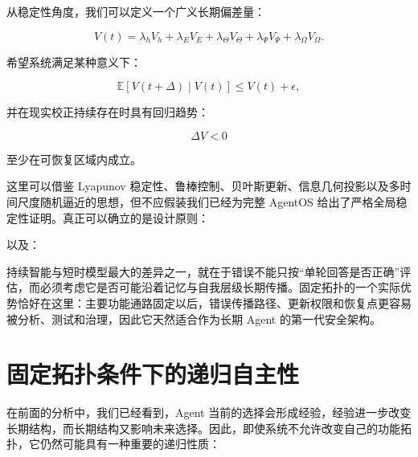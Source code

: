 从稳定性角度，我们可以定义一个广义长期偏差量：

\[
V(t)
=
\lambda_h V_h
+
\lambda_E V_E
+
\lambda_\Theta V_\Theta
+
\lambda_\Psi V_\Psi
+
\lambda_\Omega V_\Omega.
\]

希望系统满足某种意义下：

\[
\mathbb{E}
[
V(t+\Delta)
\mid
V(t)
]
\leq
V(t)+\epsilon,
\]

并在现实校正持续存在时具有回归趋势：

\[
\Delta V<0
\]

至少在可恢复区域内成立。

这里可以借鉴 Lyapunov 稳定性、鲁棒控制、贝叶斯更新、信息几何投影以及多时间尺度随机逼近的思想，但不应假装我们已经为完整 AgentOS 给出了严格全局稳定性证明。真正可以确立的是设计原则：

\begin{statementbox}
\centering
{}
\end{statementbox}

\begin{statementbox}
\centering
{}
\end{statementbox}

\begin{statementbox}
\centering
{}
\end{statementbox}

以及：

\begin{statementbox}
\centering
{}
\end{statementbox}

持续智能与短时模型最大的差异之一，就在于错误不能只按“单轮回答是否正确”评估，而必须考虑它是否可能沿着记忆与自我层级长期传播。固定拓扑的一个实际优势恰好在这里：主要功能通路固定以后，错误传播路径、更新权限和恢复点更容易被分析、测试和治理，因此它天然适合作为长期 Agent 的第一代安全架构。

\section{固定拓扑条件下的递归自主性}

在前面的分析中，我们已经看到，Agent 当前的选择会形成经验，经验进一步改变长期结构，而长期结构又影响未来选择。因此，即使系统不允许改变自己的功能拓扑，它仍然可能具有一种重要的递归性质：

